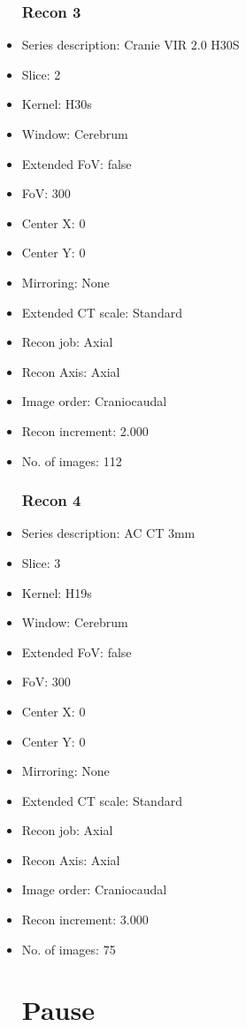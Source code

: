 \documentclass[12pt]{article}
\begin{document}
\begin{itemize}
\subsubsection{Recon 3}
\item Series description: Cranie VIR 2.0 H30S
\item Slice: 2
\item Kernel: H30s
\item Window: Cerebrum
\item Extended FoV: false
\item FoV: 300
\item Center X: 0
\item Center Y: 0
\item Mirroring: None
\item Extended CT scale: Standard
\item Recon job: Axial
\item Recon Axis: Axial
\item Image order: Craniocaudal
\item Recon increment: 2.000
\item No. of images: 112
\subsubsection{Recon 4}
\item Series description: AC CT 3mm
\item Slice: 3
\item Kernel: H19s
\item Window: Cerebrum
\item Extended FoV: false
\item FoV: 300
\item Center X: 0
\item Center Y: 0
\item Mirroring: None
\item Extended CT scale: Standard
\item Recon job: Axial
\item Recon Axis: Axial
\item Image order: Craniocaudal
\item Recon increment: 3.000
\item No. of images: 75
\section{Pause}

\end{itemize}
\end{document}
